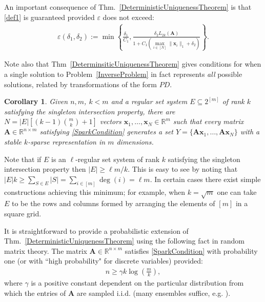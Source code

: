 \documentclass[9pt,twocolumn]{pnas-new}
\newtheorem{proposition}{Proposition}
\newtheorem{corollary}{Corollary}
\begin{document}
An important consequence of Thm.~\ref{DeterministicUniquenessTheorem} is that \eqref{def1} is guaranteed provided $\varepsilon$ does not exceed:
\begin{align}\label{epsdel}
\varepsilon(\delta_1, \delta_2) := \min \left\{ \frac{\delta_1}{ C_1 }, \frac{ \delta_2 L_{2k}(\mathbf{A})}{ 1 + C_1 \left( \max_{i \in [N]} \|\mathbf{x}_i\|_1  + \delta_2 \right) } \right\}.
\end{align}

Note also that Thm~\ref{DeterminsiticUniquenessTheorem} gives conditions for when a single solution to Problem~\ref{InverseProblem} in fact represents \emph{all} possible solutions, related by transformations of the form $PD$.

\begin{corollary}\label{DeterministicUniquenessCorollary}
Given $n, m$, $k < m$ and a regular set system $E \subseteq 2^{[m]}$ of rank $k$ satisfying the singleton intersection property, there are $N =  |E| \left[ (k-1){m \choose k}+1 \right]$ vectors \mbox{$\mathbf{x}_1, \ldots, \mathbf{x}_N \in \mathbb{R}^m$} such that every matrix $\mathbf{A} \in \mathbb{R}^{n \times m}$ satisfying \eqref{SparkCondition} generates a set $Y = \{\mathbf{A}\mathbf{x}_1, \ldots, \mathbf{A}\mathbf{x}_N\}$ with a stable $k$-sparse representation in $m$ dimensions.
\end{corollary}

Note that if $E$ is an $\ell$-regular set system of rank $k$ satisfying the singleton intersection property then $|E| \geq \ell m/k$.
This is easy to see by noting that $|E|k \geq \sum_{S \in E}|S| = \sum_{i \in [m]} \deg(i) = \ell m$. In certain cases there exist simple constructions achieving this minimum; for example, when $k = \sqrt{m}$ one can take $E$ to be the rows and columns formed by arranging the elements of $[m]$ in a square grid.

It is straightforward to provide a probabilistic extension of Thm.~\ref{DeterministicUniquenessTheorem} using the following fact in random matrix theory.  The matrix $\mathbf{A} \in \mathbb{R}^{n \times m}$ satisfies \eqref{SparkCondition} with probability one (or with ``high probability" for discrete variables) 
provided:
\begin{align}\label{CScondition}
n \geq \gamma k\log\left(\frac{m}{k}\right),
\end{align}
%
where $\gamma$ is a positive constant dependent on the particular distribution from which the entries of $\mathbf{A}$ are sampled i.i.d. (many ensembles suffice, e.g. \cite[Sec.~4]{Baraniuk08}). 
\end{document}
